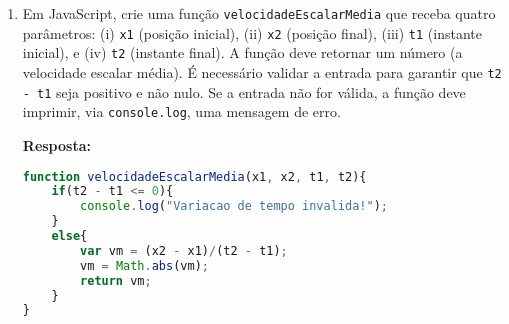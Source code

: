 \documentclass[12pt,a4paper,oneside]{article}
\begin{document}
\begin{enumerate}
\newpage

\item Em JavaScript, crie uma função {\tt velocidadeEscalarMedia} que receba quatro parâmetros: (i) {\tt x1} (posição inicial), (ii) {\tt x2} (posição final), (iii) {\tt t1} (instante inicial), e (iv) {\tt t2} (instante final). A função deve retornar um número (a velocidade escalar média). É necessário validar a entrada para garantir que  {\tt t2 - t1} seja positivo e não nulo. Se a entrada não for válida, a função deve imprimir, via {\tt console.log}, uma mensagem de erro.

{\color{blue} \bf Resposta: }

\begin{lstlisting}[language=JavaScript]
function velocidadeEscalarMedia(x1, x2, t1, t2){
	if(t2 - t1 <= 0){
		console.log("Variacao de tempo invalida!");
	}
	else{
		var vm = (x2 - x1)/(t2 - t1);
		vm = Math.abs(vm);
		return vm;
	}
}\end{lstlisting}
	
	\end{enumerate}
\end{document}
